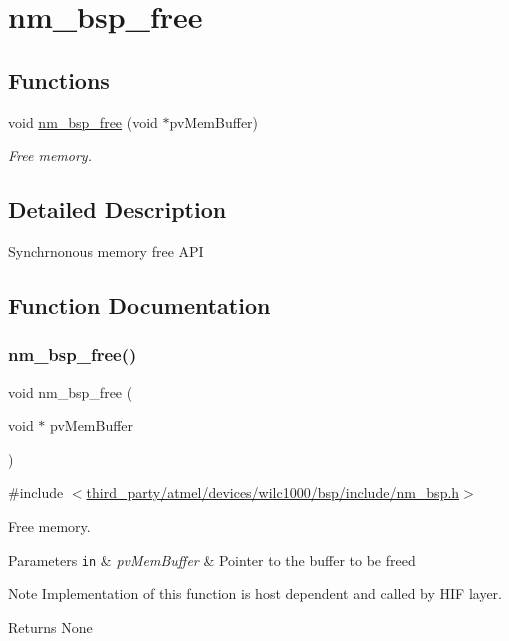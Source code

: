 \hypertarget{group__NmBspFree}{}\section{nm\+\_\+bsp\+\_\+free}
\label{group__NmBspFree}
\subsection*{Functions}
\begin{DoxyCompactItemize}
\item 
void \hyperlink{group__NmBspFree_ga355331fdbf9c5e1c60e2d14d028e4937}{nm\+\_\+bsp\+\_\+free} (void $\ast$pv\+Mem\+Buffer)
\begin{DoxyCompactList}\small\item\em Free memory. \end{DoxyCompactList}\end{DoxyCompactItemize}


\subsection{Detailed Description}
Synchrnonous memory free A\+PI 

\subsection{Function Documentation}
\mbox{\label{group__NmBspFree_ga355331fdbf9c5e1c60e2d14d028e4937}} 
\subsubsection{\texorpdfstring{nm\+\_\+bsp\+\_\+free()}{nm\_bsp\_free()}}
{\footnotesize\ttfamily void nm\+\_\+bsp\+\_\+free (\begin{DoxyParamCaption}\item[{void $\ast$}]{pv\+Mem\+Buffer }\end{DoxyParamCaption})}



{\ttfamily \#include $<$\hyperlink{nm__bsp_8h}{third\+\_\+party/atmel/devices/wilc1000/bsp/include/nm\+\_\+bsp.\+h}$>$}



Free memory. 


\begin{DoxyParams}[1]{Parameters}
\mbox{\tt in}  & {\em pv\+Mem\+Buffer} & Pointer to the buffer to be freed \\
\hline
\end{DoxyParams}
\begin{DoxyNote}{Note}
Implementation of this function is host dependent and called by H\+IF layer. 
\end{DoxyNote}
\begin{DoxyReturn}{Returns}
None 
\end{DoxyReturn}
